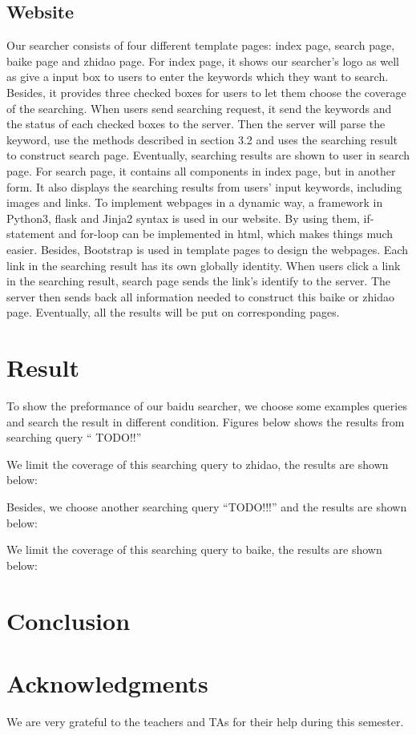 \documentclass[10pt,times,twocolumn]{article}
\begin{document}
\subsection{Website}
Our searcher consists of four different template pages: index page, search page, baike page and zhidao page. 
\newline
For index page, it shows our searcher’s logo as well as give a input box to users to enter the keywords which they want to search. Besides, it provides three checked boxes for users to let them choose the coverage of the searching.  When users send searching request, it send the keywords and the status of each checked boxes to the server. Then the server will parse the keyword, use the methods described in section 3.2 and uses the searching result to construct search page. Eventually, searching results are shown to user in search page.
\newline
For search page, it contains all components in index page, but in another form. It also displays the searching results from users’ input keywords, including images and links. To implement webpages in a  dynamic way,  a framework in Python3, flask and Jinja2 syntax is used in our website. By using them, if-statement and for-loop can be implemented in html, which makes things much easier. Besides, Bootstrap is used in template pages to design the webpages. 
\newline
Each link in the searching result has its own globally identity. When users click a link in the searching result, search page sends the link’s identify to the server. The server then sends back all information needed to construct this baike or zhidao page. Eventually, all the results will be put on corresponding pages.


\section{Result}

To show the preformance of our baidu searcher, we choose some examples queries and search the result in different condition. Figures below shows the results from searching query “ TODO!!”  


We limit the coverage of this searching query to zhidao, the results are shown below:



Besides, we choose another searching query “TODO!!!” and the results are shown below:


We limit the coverage of this searching query to baike, the results are shown below:


\section{Conclusion}

\section{Acknowledgments}
We are very grateful to the teachers and TAs for their help during this semester. 



\end{document}
